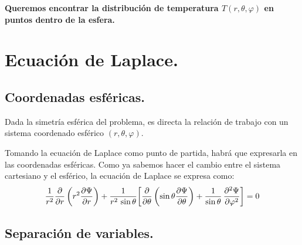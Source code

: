 \textbf{Queremos encontrar la distribución de temperatura $T(r, \theta, \varphi)$ en puntos dentro de la esfera.}

\section{Ecuación de Laplace.}
\subsection{Coordenadas esféricas.}

Dada la simetría esférica del problema, es directa la relación de trabajo con un sistema coordenado esférico $(r, \theta, \varphi)$.
\par
Tomando la ecuación de Laplace como punto de partida, habrá que expresarla en las coordenadas esféricas. Como ya sabemos hacer el cambio entre el sistema cartesiano y el esférico, la ecuación de Laplace se expresa como:
\begin{align}
\dfrac{1}{r^{2}} \pdv{r} \left( r^{2} \pdv{\Psi}{r} \right) + \dfrac{1}{r^{2} \, \sin \theta} \bigg[ \pdv{\theta} \left( \sin \theta \pdv{\Psi}{\theta} \right) + \dfrac{1}{\sin \theta} \, \pdv[2]{\Psi}{\varphi} \bigg] = 0
\label{eq:ecuacion_22_15}
\end{align}

\subsection{Separación de variables.}


